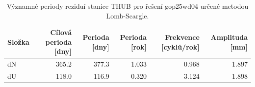 \begin{table}[H]
\centering
\caption{Významné periody reziduí stanice THUB pro řešení gop25wd04 určené metodou Lomb-Scargle.}
\label{tab:gop25wd04_stcd_thub_detr_weighted_multiseg_spectral_lomb_scargle_significant_periods}
\begin{tabular}{lrrrrr}
\toprule
Složka & Cílová perioda [dny] & Perioda [dny] & Perioda [rok] & Frekvence [cyklů/rok] & Amplituda [mm] \\
\midrule
dN & 365.2 & 377.3 & 1.033 & 0.968 & 1.897 \\
dU & 118.0 & 116.9 & 0.320 & 3.124 & 1.898 \\
\bottomrule
\end{tabular}
\end{table}
